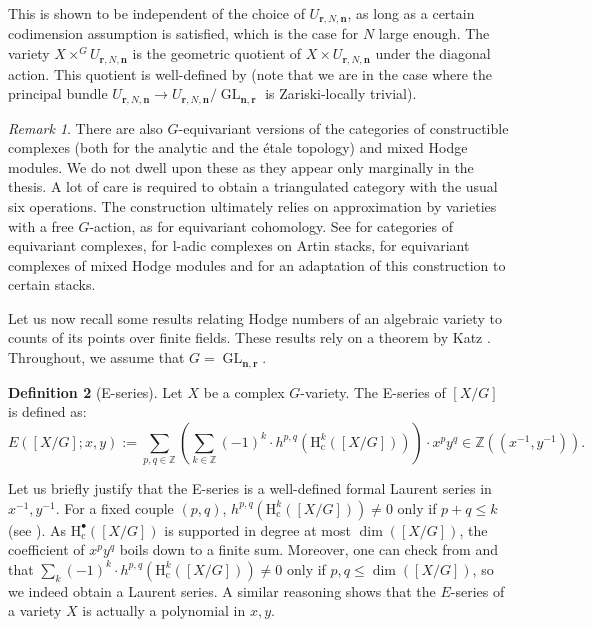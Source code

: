 \documentclass[11pt,english]{article}
\numberwithin{equation}{section}
\numberwithin{figure}{section}
\theoremstyle{definition}
\newtheorem{df}{Definition}[subsection]
\theoremstyle{plain}
\theoremstyle{remark}
\newtheorem{rmk}[df]{Remark}
\DeclareMathOperator{\GL}{GL}
\newcommand\nn{\mathbf{n}}
\newcommand\rr{\mathbf{r}}
\newcommand\HH{\mathrm{H}}
\newcommand\ZZ{\mathbb{Z}}
\begin{document}
This is shown to be independent of the choice of $U_{\rr,N,\nn}$,
as long as a certain codimension assumption is satisfied, which is
the case for $N$ large enough. The variety $X\times^{G}U_{\rr,N,\nn}$
is the geometric quotient of $X\times U_{\rr,N,\nn}$ under the diagonal
action. This quotient is well-defined by \cite[Prop. 23]{EG98a} (note
that we are in the case where the principal bundle $U_{\rr,N,\nn}\rightarrow U_{\rr,N,\nn}/\GL_{\nn,\rr}$
is Zariski-locally trivial).

\begin{rmk}

There are also $G$-equivariant versions of the categories of constructible
complexes (both for the analytic and the étale topology) and mixed
Hodge modules. We do not dwell upon these as they appear only marginally
in the thesis. A lot of care is required to obtain a triangulated
category with the usual six operations. The construction ultimately
relies on approximation by varieties with a free $G$-action, as for
equivariant cohomology. See \cite{BL94} for categories of equivariant
complexes, \cite{LO08} for l-adic complexes on Artin stacks, \cite{Ach13}
for equivariant complexes of mixed Hodge modules and \cite[\S 3.2.2.]{DHSM22}
for an adaptation of this construction to certain stacks.

\end{rmk}

Let us now recall some results relating Hodge numbers of an algebraic
variety to counts of its points over finite fields. These results
rely on a theorem by Katz \cite[Appendix, Thm. 6.1.2.]{HRV08}. Throughout,
we assume that $G=\GL_{\nn,\rr}$.

\begin{df}[E-series]

Let $X$ be a complex $G$-variety. The E-series of $[X/G]$ is defined
as:\[
E([X/G];x,y):=\sum_{p,q\in\ZZ}\left(\sum_{k\in\ZZ}(-1)^k\cdot h^{p,q}\left(\HH_{\mathrm{c}}^{k}([X/G])\right)\right)\cdot x^py^q\in\ZZ((x^{-1},y^{-1})).
\]

\end{df}

Let us briefly justify that the E-series is a well-defined formal
Laurent series in $x^{-1},y^{-1}$. For a fixed couple $(p,q)$, $h^{p,q}\left(\HH_{\mathrm{c}}^{k}([X/G])\right)\ne0$
only if $p+q\leq k$ (see \cite[Ch. 5, Prop. 5.54.]{PS08}). As $\HH_{\mathrm{c}}^{\bullet}([X/G])$
is supported in degree at most $\dim\left([X/G]\right)$, the coefficient
of $x^{p}y^{q}$ boils down to a finite sum. Moreover, one can check
from \cite[Thm. 8.2.4.]{Del74a} and \cite[Ch. 5, Def. 5.52.]{PS08}
that $\sum_{k}(-1)^{k}\cdot h^{p,q}\left(\HH_{\mathrm{c}}^{k}([X/G])\right)\ne0$
only if $p,q\leq\dim\left([X/G]\right)$, so we indeed obtain a Laurent
series. A similar reasoning shows that the $E$-series of a variety
$X$ is actually a polynomial in $x,y$.
\end{document}
